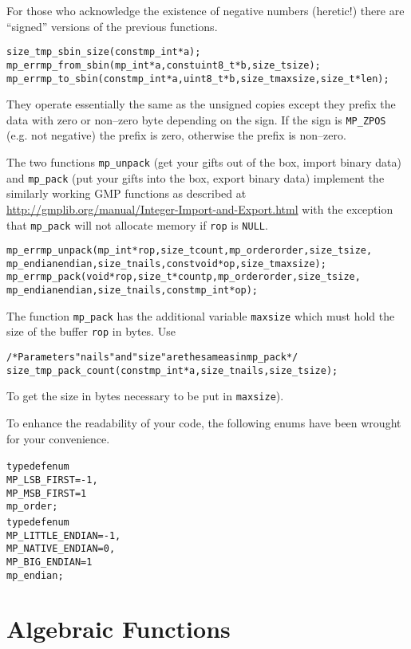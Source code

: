 \documentclass[synpaper]{book}
\begin{document}
For those who acknowledge the existence of negative numbers (heretic!) there are ``signed''
versions of the previous functions.
  
\begin{alltt}
size_t mp_sbin_size(const mp_int *a);
mp_err mp_from_sbin(mp_int *a, const uint8_t *b, size_t size);
mp_err mp_to_sbin(const mp_int *a, uint8_t *b, size_t maxsize, size_t *len);
\end{alltt}
They operate essentially the same as the unsigned copies except they prefix the data with zero or
non--zero byte depending on the sign. If the sign is \texttt{MP\_ZPOS} (e.g. not negative) the
prefix is zero, otherwise the prefix is non--zero.

The two functions \texttt{mp\_unpack} (get your gifts out of the box, import binary data) and
\texttt{mp\_pack} (put your gifts into the box, export binary data) implement the similarly working
GMP functions as described at \url{http://gmplib.org/manual/Integer-Import-and-Export.html} with
the exception that \texttt{mp\_pack} will not allocate memory if \texttt{rop} is \texttt{NULL}.
 
\begin{alltt}
mp_err mp_unpack(mp_int *rop, size_t count, mp_order order, size_t size,
             mp_endian endian, size_t nails, const void *op, size_t maxsize);
mp_err mp_pack(void *rop, size_t *countp, mp_order order, size_t size,
             mp_endian endian, size_t nails, const mp_int *op);
\end{alltt}
The function \texttt{mp\_pack} has the additional variable \texttt{maxsize} which must hold the
size of the buffer \texttt{rop} in bytes. Use
\begin{alltt}
/* Parameters "nails" and "size" are the same as in mp_pack */
size_t mp_pack_count(const mp_int *a, size_t nails, size_t size);
\end{alltt}
To get the size in bytes necessary to be put in \texttt{maxsize}).

To enhance the readability of your code, the following enums have been wrought for your
convenience.
\begin{alltt}
typedef enum {
   MP_LSB_FIRST = -1,
   MP_MSB_FIRST =  1
} mp_order;
typedef enum {
   MP_LITTLE_ENDIAN  = -1,
   MP_NATIVE_ENDIAN  =  0,
   MP_BIG_ENDIAN     =  1
} mp_endian;
\end{alltt}

\chapter{Algebraic Functions}
\end{document}
